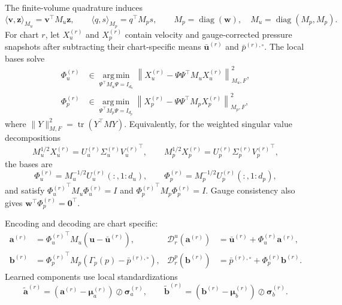 The finite-volume quadrature induces
\begin{equation}
 \langle\bm v,\bm z\rangle_{M_u}=\bm v^\top M_u\bm z,
 \qquad \langle q,s\rangle_{M_p}=q^\top M_p s,
 \qquad M_p=\operatorname{diag}(\bm w),\quad M_u=\operatorname{diag}(M_p,M_p).
 \label{eq:app_weighted_inner_products}
\end{equation}
For chart $r$, let $X_u^{(r)}$ and $X_p^{(r)}$ contain velocity and gauge-corrected pressure snapshots after subtracting their chart-specific means $\bar{\bm u}^{(r)}$ and $\bar p^{(r),\circ}$. The local bases solve
\begin{align}
 \Phi_u^{(r)}&\in\underset{\Psi^\top M_u\Psi=I_{d_u}}{\operatorname{arg\,min}}
 \left\|X_u^{(r)}-\Psi\Psi^\top M_uX_u^{(r)}\right\|_{M_u,F}^2,\\
 \Phi_p^{(r)}&\in\underset{\Psi^\top M_p\Psi=I_{d_p}}{\operatorname{arg\,min}}
 \left\|X_p^{(r)}-\Psi\Psi^\top M_pX_p^{(r)}\right\|_{M_p,F}^2,
 \label{eq:app_pod_optimization}
\end{align}
where $\|Y\|_{M,F}^2=\operatorname{tr}(Y^\top MY)$. Equivalently, for the weighted singular value decompositions
\begin{equation}
 M_u^{1/2}X_u^{(r)}=U_u^{(r)}\Sigma_u^{(r)}{V_u^{(r)}}^\top,
 \qquad M_p^{1/2}X_p^{(r)}=U_p^{(r)}\Sigma_p^{(r)}{V_p^{(r)}}^\top,
\end{equation}
the bases are
\begin{equation}
 \Phi_u^{(r)}=M_u^{-1/2}U_u^{(r)}(:,1{:}d_u),
 \qquad \Phi_p^{(r)}=M_p^{-1/2}U_p^{(r)}(:,1{:}d_p),
 \label{eq:app_weighted_svd_bases}
\end{equation}
and satisfy ${\Phi_u^{(r)}}^\top M_u\Phi_u^{(r)}=I$ and ${\Phi_p^{(r)}}^\top M_p\Phi_p^{(r)}=I$. Gauge consistency also gives $\bm w^\top\Phi_p^{(r)}=\bm 0^\top$.

Encoding and decoding are chart specific:
\begin{align}
 \bm a^{(r)}&={\Phi_u^{(r)}}^\top M_u(\bm u-\bar{\bm u}^{(r)}),
 &\mathcal D_r^u(\bm a^{(r)})&=\bar{\bm u}^{(r)}+\Phi_u^{(r)}\bm a^{(r)},\\
 \bm b^{(r)}&={\Phi_p^{(r)}}^\top M_p(\Gamma_p(p)-\bar p^{(r),\circ}),
 &\mathcal D_r^p(\bm b^{(r)})&=\bar p^{(r),\circ}+\Phi_p^{(r)}\bm b^{(r)}.
 \label{eq:app_encode_decode}
\end{align}
Learned components use local standardizations
\begin{equation}
 \widetilde{\bm a}^{(r)}=(\bm a^{(r)}-\bm\mu_a^{(r)})\oslash\bm\sigma_a^{(r)},
 \qquad
 \widetilde{\bm b}^{(r)}=(\bm b^{(r)}-\bm\mu_b^{(r)})\oslash\bm\sigma_b^{(r)}.
 \label{eq:app_local_scalers}
\end{equation}


